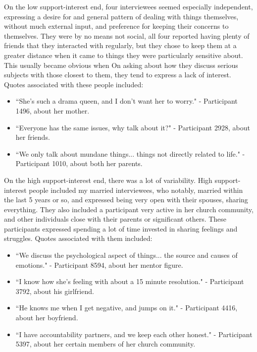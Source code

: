   On the low support-interest end, four interviewees seemed especially independent,
  expressing a desire for and general pattern of dealing with things
  themselves, without much external input,
  and preference for keeping their concerns to themselves.
  They were by no means not social,
  all four reported having plenty of friends that they interacted with regularly,
  but they chose to keep them at a greater distance when it came to things
  they were particularly sensitive about.
  This usually became obvious when 
  On asking about how they discuss serious subjects with those closest to them,
  they tend to express a lack of interest.
  Quotes associated with these people included:
  \begin{itemize}
  \item ``She's such a drama queen, and I don't want her to worry."
  - Participant 1496, about her mother.
  \item ``Everyone has the same issues, why talk about it?"
  - Participant 2928, about her friends.
  \item ``We only talk about mundane things...
  things not directly related to life."
  - Participant 1010, about both her parents.
  \end{itemize}

  On the high support-interest end, there was a lot of variability.
  High support-interest people included my married interviewees, who notably,
  married within the last 5 years or so,
  and expressed being very open with their spouses, sharing everything.
  They also included a participant very active in her church community,
  and other individuals close with their parents or significant others.
  These participants expressed spending a lot of time invested in
  sharing feelings and struggles.
  Quotes associated with them included:
  \begin{itemize}
  \item ``We discuss the psychological aspect of things...
  the source and causes of emotions."
  - Participant 8594, about her mentor figure.
  \item  ``I know how she's feeling with about a 15 minute resolution."
  - Participant 3792, about his girlfriend.
  \item ``He knows me when I get negative, and jumps on it."
  - Participant 4416, about her boyfriend.
  \item ``I have accountability partners, and we keep each other honest."
  - Participant 5397, about her certain members of her church community.
  \end{itemize}

